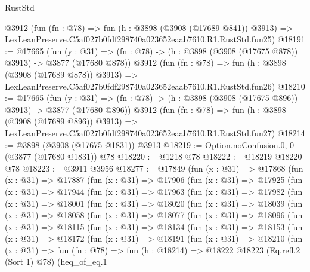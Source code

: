 \begin{lexlean}{RustStd}
\begin{coremodule}
    @3912
    (fun (fn : @78) =>
    fun (h : @3898 (@3908 (@17689 @841)) @3913) =>
    LexLeanPreserve.C5af027b0fdf298740a023652eaab7610.R1.RustStd.fun25)
@18191 := @17665
    (fun (y : @31) => (fn : @78) -> (h : @3898 (@3908 (@17675 @878)) @3913) -> @3877 (@17680 @878))
    @3912
    (fun (fn : @78) =>
    fun (h : @3898 (@3908 (@17689 @878)) @3913) =>
    LexLeanPreserve.C5af027b0fdf298740a023652eaab7610.R1.RustStd.fun26)
@18210 := @17665
    (fun (y : @31) => (fn : @78) -> (h : @3898 (@3908 (@17675 @896)) @3913) -> @3877 (@17680 @896))
    @3912
    (fun (fn : @78) =>
    fun (h : @3898 (@3908 (@17689 @896)) @3913) =>
    LexLeanPreserve.C5af027b0fdf298740a023652eaab7610.R1.RustStd.fun27)
@18214 := @3898 (@3908 (@17675 @1831)) @3913
@18219 := Option.noConfusion.{0, 0} (@3877 (@17680 @1831)) @78
@18220 := @1218 @78
@18222 := @18219 @18220 @78
@18223 := @3911 @3956
@18277 := @17849
    (fun (x : @31) =>
    @17868
      (fun (x : @31) =>
      @17887
        (fun (x : @31) =>
        @17906
          (fun (x : @31) =>
          @17925
            (fun (x : @31) =>
            @17944
              (fun (x : @31) =>
              @17963
                (fun (x : @31) =>
                @17982
                  (fun (x : @31) =>
                  @18001
                    (fun (x : @31) =>
                    @18020
                      (fun (x : @31) =>
                      @18039
                        (fun (x : @31) =>
                        @18058
                          (fun (x : @31) =>
                          @18077
                            (fun (x : @31) =>
                            @18096
                              (fun (x : @31) =>
                              @18115
                                (fun (x : @31) =>
                                @18134
                                  (fun (x : @31) =>
                                  @18153
                                    (fun (x : @31) =>
                                    @18172
                                      (fun (x : @31) =>
                                      @18191
                                        (fun (x : @31) =>
                                        @18210
                                          (fun (x : @31) =>
                                          fun (fn : @78) =>
                                          fun (h : @18214) =>
                                          @18222
                                            @18223
                                            (Eq.refl.{2} (Sort 1) @78)
                                            (heq_of_eq.{1}

\end{coremodule}
\end{lexlean}

